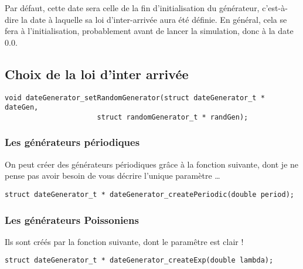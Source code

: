    Par défaut, cette date sera celle de la fin d'initialisation du
générateur, c'est-à-dire la date à laquelle sa loi d'inter-arrivée
aura été définie. En général, cela se fera à l'initialisation,
probablement avant de lancer la simulation, donc à la date 0.0.

%
\subsection{Choix de la loi d'inter arrivée}

\begin{verbatim}
void dateGenerator_setRandomGenerator(struct dateGenerator_t * dateGen,
				      struct randomGenerator_t * randGen);
\end{verbatim}

%
\subsubsection{Les générateurs périodiques}

   On peut créer des générateurs périodiques grâce à la fonction
suivante, dont je ne pense pas avoir besoin de vous décrire l'unique
paramètre \ldots

\begin{verbatim}
struct dateGenerator_t * dateGenerator_createPeriodic(double period);
\end{verbatim}

%
\subsubsection{Les générateurs Poissoniens}

   Ils sont créés par la fonction suivante, dont le paramêtre est
clair !

\begin{verbatim}
struct dateGenerator_t * dateGenerator_createExp(double lambda);
\end{verbatim}

